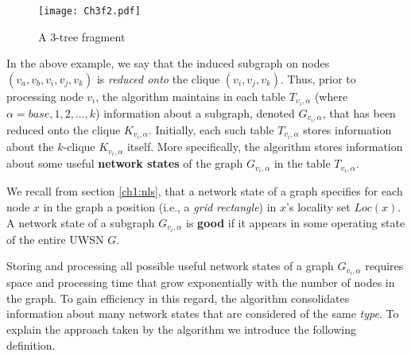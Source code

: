 \begin{figure}[!htb]
\centering
\texttt{[image: Ch3f2.pdf]}
 \caption{ A 3-tree fragment
 \label{fig:f32t}
}
\end{figure}
In the above example, we say that the induced subgraph  on nodes $(v_a, v_b, v_i, v_j, v_k)$ is \textit{reduced onto} the clique $(v_i, v_j, v_k)$. Thus, prior to processing node $v_i$, the algorithm maintains in each table $T_{v_i,\alpha}$ (where $\alpha=base, 1, 2, \ldots, k$) information about a subgraph, denoted $G_{v_i,\alpha}$, that has been reduced onto the clique $K_{v_i,\alpha}$. Initially, each such table $T_{v_i,\alpha}$ stores information about the $k$-clique $K_{v_i,\alpha}$ itself. More specifically, the algorithm stores information about some useful \textbf{network states} of the graph $G_{v_i,\alpha}$ in the table $T_{v_i,\alpha}$. 

We recall from section \ref{ch1:nls}, that a network state of a graph specifies for each node $x$ in the graph a position (i.e., a \textit{grid rectangle}) in $x$'s locality set $Loc(x)$. A network state of a subgraph $G_{v_i,\alpha}$ is \textbf{good} if it appears in some operating state of the entire UWSN $G$. 

Storing and processing all possible useful network states of a graph $G_{v_i,\alpha}$ requires space and processing time that grow exponentially with the number of nodes in the graph. To gain efficiency in this regard, the algorithm consolidates information about many network states that are considered of the same \textit{type}. To explain the approach taken by the algorithm we introduce the following definition.

